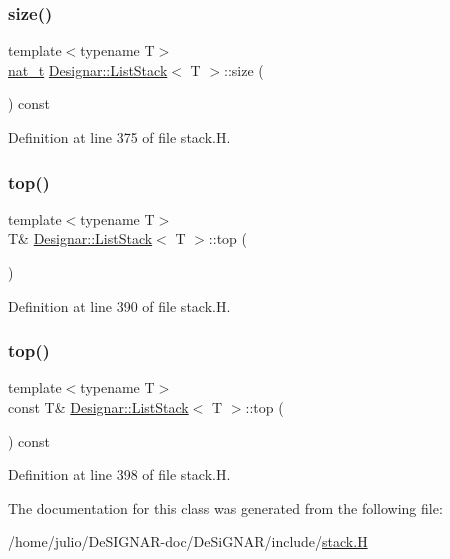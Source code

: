 \subsubsection{\texorpdfstring{size()}{size()}}
{\footnotesize\ttfamily template$<$typename T$>$ \\
\hyperlink{namespace_designar_aa72662848b9f4815e7bf31a7cf3e33d1}{nat\+\_\+t} \hyperlink{class_designar_1_1_list_stack}{Designar\+::\+List\+Stack}$<$ T $>$\+::size (\begin{DoxyParamCaption}{ }\end{DoxyParamCaption}) const\hspace{0.3cm}{\ttfamily [inline]}}



Definition at line 375 of file stack.\+H.

\mbox{\label{class_designar_1_1_list_stack_a5b6e47be80da93039d31cd885e97cf34}} 
\subsubsection{\texorpdfstring{top()}{top()}\hspace{0.1cm}{\footnotesize\ttfamily [1/2]}}
{\footnotesize\ttfamily template$<$typename T$>$ \\
T\& \hyperlink{class_designar_1_1_list_stack}{Designar\+::\+List\+Stack}$<$ T $>$\+::top (\begin{DoxyParamCaption}{ }\end{DoxyParamCaption})\hspace{0.3cm}{\ttfamily [inline]}}



Definition at line 390 of file stack.\+H.

\mbox{\label{class_designar_1_1_list_stack_a6eafdfa1a1a43b4cbbe27730a7dcffd3}} 
\subsubsection{\texorpdfstring{top()}{top()}\hspace{0.1cm}{\footnotesize\ttfamily [2/2]}}
{\footnotesize\ttfamily template$<$typename T$>$ \\
const T\& \hyperlink{class_designar_1_1_list_stack}{Designar\+::\+List\+Stack}$<$ T $>$\+::top (\begin{DoxyParamCaption}{ }\end{DoxyParamCaption}) const\hspace{0.3cm}{\ttfamily [inline]}}



Definition at line 398 of file stack.\+H.



The documentation for this class was generated from the following file\+:\begin{DoxyCompactItemize}
\item 
/home/julio/\+De\+S\+I\+G\+N\+A\+R-\/doc/\+De\+Si\+G\+N\+A\+R/include/\hyperlink{stack_8_h}{stack.\+H}\end{DoxyCompactItemize}
